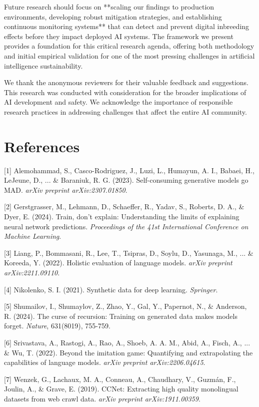 \documentclass{article}
\begin{document}
Future research should focus on **scaling our findings to production environments, developing robust mitigation strategies, and establishing continuous monitoring systems** that can detect and prevent digital inbreeding effects before they impact deployed AI systems. The framework we present provides a foundation for this critical research agenda, offering both methodology and initial empirical validation for one of the most pressing challenges in artificial intelligence sustainability.

\begin{ack}
We thank the anonymous reviewers for their valuable feedback and suggestions. This research was conducted with consideration for the broader implications of AI development and safety. We acknowledge the importance of responsible research practices in addressing challenges that affect the entire AI community.
\end{ack}

\section*{References}

{
\small

[1] Alemohammad, S., Casco-Rodriguez, J., Luzi, L., Humayun, A. I., Babaei, H., LeJeune, D., ... \& Baraniuk, R. G. (2023). Self-consuming generative models go MAD. \textit{arXiv preprint arXiv:2307.01850}.

[2] Gerstgrasser, M., Lehmann, D., Schaeffer, R., Yadav, S., Roberts, D. A., \& Dyer, E. (2024). Train, don't explain: Understanding the limits of explaining neural network predictions. \textit{Proceedings of the 41st International Conference on Machine Learning}.

[3] Liang, P., Bommasani, R., Lee, T., Tsipras, D., Soylu, D., Yasunaga, M., ... \& Koreeda, Y. (2022). Holistic evaluation of language models. \textit{arXiv preprint arXiv:2211.09110}.

[4] Nikolenko, S. I. (2021). Synthetic data for deep learning. \textit{Springer}.

[5] Shumailov, I., Shumaylov, Z., Zhao, Y., Gal, Y., Papernot, N., \& Anderson, R. (2024). The curse of recursion: Training on generated data makes models forget. \textit{Nature}, 631(8019), 755-759.

[6] Srivastava, A., Rastogi, A., Rao, A., Shoeb, A. A. M., Abid, A., Fisch, A., ... \& Wu, T. (2022). Beyond the imitation game: Quantifying and extrapolating the capabilities of language models. \textit{arXiv preprint arXiv:2206.04615}.

[7] Wenzek, G., Lachaux, M. A., Conneau, A., Chaudhary, V., Guzmán, F., Joulin, A., \& Grave, E. (2019). CCNet: Extracting high quality monolingual datasets from web crawl data. \textit{arXiv preprint arXiv:1911.00359}.

}
\end{document}

